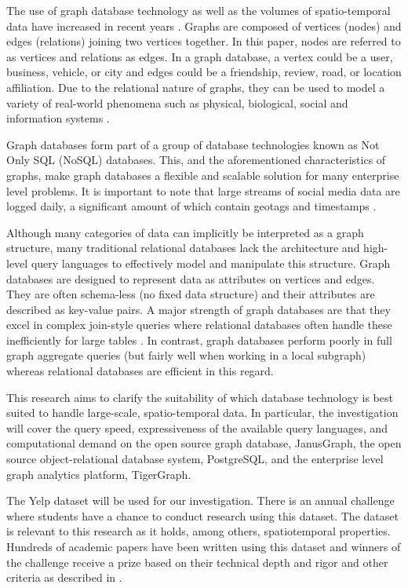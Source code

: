 The use of graph database technology as well as the volumes of spatio-temporal data have increased in recent years \cite{mongovspostgres}. Graphs are composed of vertices (nodes) and edges (relations) joining two vertices together. In this paper, nodes are referred to as vertices and relations as edges. In a graph database, a vertex could be a user, business, vehicle, or city and edges could be a friendship, review, road, or location affiliation. Due to the relational nature of graphs, they can be used to model a variety of real-world phenomena such as physical, biological, social and information systems \cite{socialdata}.

Graph databases form part of a group of database technologies known as Not Only SQL (NoSQL) databases. This, and the aforementioned characteristics of graphs, make graph databases a flexible and scalable solution for many enterprise level problems. It is important to note that large streams of social media data are logged daily, a significant amount of which contain geotags and timestamps \cite{twitterdata}.

Although many categories of data can implicitly be interpreted as a graph structure, many traditional relational databases lack the architecture and high-level query languages to effectively model and manipulate this structure. Graph databases are designed to represent data as attributes on vertices and edges. They are often schema-less (no fixed data structure) and their attributes are described as key-value pairs. A major strength of graph databases are that they excel in complex join-style queries where relational databases often handle these inefficiently for large tables \cite{data-in-nosql}. In contrast, graph databases perform poorly in full graph aggregate queries (but fairly well when working in a local subgraph) whereas relational databases are efficient in this regard.

This research aims to clarify the suitability of which database technology is best suited to handle large-scale, spatio-temporal data. In particular, the investigation will cover the query speed, expressiveness of the available query languages, and computational demand on the open source graph database, JanusGraph, the open source object-relational database system, PostgreSQL, and the enterprise level graph analytics platform, TigerGraph.

The Yelp dataset will be used for our investigation. There is an annual challenge where students have a chance to conduct research using this dataset. The dataset is relevant to this research as it holds, among others, spatiotemporal properties. Hundreds of academic papers have been written using this dataset and winners of the challenge receive a prize based on their technical depth and rigor and other criteria as described in \cite{yelpdataset}.

